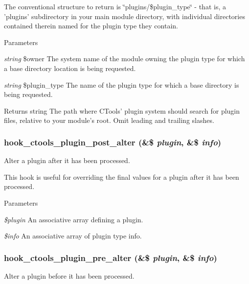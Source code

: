 The conventional structure to return is \char`\"{}plugins/\$plugin\_\-type\char`\"{} -\/ that is, a 'plugins' subdirectory in your main module directory, with individual directories contained therein named for the plugin type they contain.


\begin{DoxyParams}{Parameters}
\item[{\em string}]\$owner The system name of the module owning the plugin type for which a base directory location is being requested. \item[{\em string}]\$plugin\_\-type The name of the plugin type for which a base directory is being requested. \end{DoxyParams}
\begin{DoxyReturn}{Returns}
string The path where CTools' plugin system should search for plugin files, relative to your module's root. Omit leading and trailing slashes. 
\end{DoxyReturn}
\hypertarget{group__hooks_ga2f8a7bad70a9bcb0748a13463a32d362}{
\subsubsection[{hook\_\-ctools\_\-plugin\_\-post\_\-alter}]{\setlength{\rightskip}{0pt plus 5cm}hook\_\-ctools\_\-plugin\_\-post\_\-alter (\&\$ {\em plugin}, \/  \&\$ {\em info})}}
\label{group__hooks_ga2f8a7bad70a9bcb0748a13463a32d362}
Alter a plugin after it has been processed.

This hook is useful for overriding the final values for a plugin after it has been processed.


\begin{DoxyParams}{Parameters}
\item[{\em \$plugin}]An associative array defining a plugin. \item[{\em \$info}]An associative array of plugin type info. \end{DoxyParams}
\hypertarget{group__hooks_ga4ae530d112605c111f7bdead789ed91d}{
\subsubsection[{hook\_\-ctools\_\-plugin\_\-pre\_\-alter}]{\setlength{\rightskip}{0pt plus 5cm}hook\_\-ctools\_\-plugin\_\-pre\_\-alter (\&\$ {\em plugin}, \/  \&\$ {\em info})}}
\label{group__hooks_ga4ae530d112605c111f7bdead789ed91d}
Alter a plugin before it has been processed.

